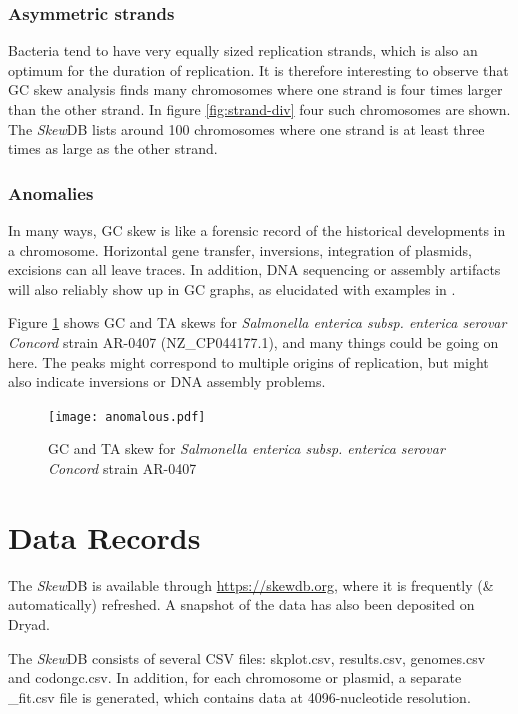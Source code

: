 \documentclass[fleqn,10pt]{wlscirep}
\begin{document}
\subsubsection*{Asymmetric strands}
Bacteria tend to have very equally sized replication strands, which is also an optimum for the duration of replication. It is therefore interesting to observe that GC skew analysis finds many chromosomes where one strand is four times larger than the other strand.  In  figure \ref{fig:strand-div} four such chromosomes are shown. The \emph{Skew}DB lists around 100 chromosomes where one strand is at least three times as large as the other strand.


\subsubsection*{Anomalies}
In many ways, GC skew is like a forensic record of the historical developments in a chromosome. Horizontal gene transfer, inversions, integration of plasmids, excisions can all leave traces. In addition, DNA sequencing or assembly artifacts will also reliably show up in GC graphs, as elucidated with examples in \cite{lu_skewit_2020}.

Figure \ref{fig:anomalous} shows GC and TA skews for \emph{Salmonella enterica subsp. enterica serovar Concord} strain AR-0407 (NZ\_CP044177.1), and many things could be going on here. The peaks might correspond to multiple origins of replication, but might also indicate inversions or DNA assembly problems.

\begin{figure}[ht]
\centering
\texttt{[image: anomalous.pdf]}
\caption{GC and TA skew for \emph{Salmonella enterica subsp. enterica serovar Concord} strain AR-0407}
\label{fig:anomalous}
\end{figure}

\section*{Data Records}
The \emph{Skew}DB is available through \url{https://skewdb.org}, where it is frequently (\& automatically) refreshed. A snapshot of the data has also been deposited on Dryad\cite{https://doi.org/10.5061/dryad.g4f4qrfr6}.

The \emph{Skew}DB consists of several CSV files: skplot.csv, results.csv, genomes.csv and codongc.csv.
In addition, for each chromosome or plasmid, a separate \_fit.csv file is generated, which contains data at 4096-nucleotide resolution.
\end{document}
